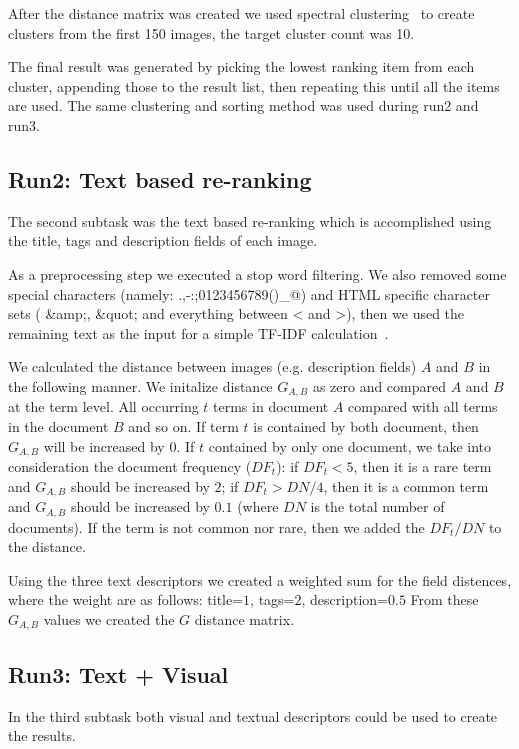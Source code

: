 \documentclass{acm_proc_article-me}
\begin{document}
After the distance matrix was created we used spectral clustering~\cite{Ma2009,Ng01onspectral} to create clusters from the first 150 images, the target cluster count was 10. 

The final result was generated by picking the lowest ranking item from each cluster, appending those to the result list, then repeating this until all the items are used. The same clustering and sorting method was used during run2 and run3.

\subsection{Run2: Text based re-ranking}
The second subtask was the text based re-ranking which is accomplished using the title, tags and description fields of each image.

As a preprocessing step we executed a stop word filtering. We also removed some special characters (namely: .,-:;0123456789()\_@) and HTML specific character sets ( \&amp;, \&quot; and everything between < and >), then we used the remaining text as the input for a simple TF-IDF calculation~\cite{Yeh2008}. 

 We calculated the distance between images (e.g. description fields) $A$ and $B$ in the following manner. We initalize distance $G_{A,B}$ as zero and compared $A$ and $B$ at the term level. All occurring $t$ terms in document $A$ compared with all terms in the document $B$ and so on. If term $t$ is contained by both document, then $G_{A,B}$ will be increased by $0$. If $t$ contained by only one document, we take into consideration the document frequency ($DF_t$): if $DF_t<5$, then it is a rare term and $G_{A,B}$ should be increased by $2$; if $DF_t>DN/4$, then it is a common term and  $G_{A,B}$ should be increased by $0.1$ (where $DN$ is the total number of documents). If the term is not common nor rare, then we added the $DF_t/DN$ to the distance. 
 
Using the three text descriptors we created a weighted sum for the field distences, where the weight are as follows: title=$1$, tags=$2$, description=$0.5$ From these $G_{A,B}$ values we created the $G$ distance matrix.

\subsection{Run3: Text + Visual}
In the third subtask both visual and textual descriptors could be used to create the results.
\end{document}
